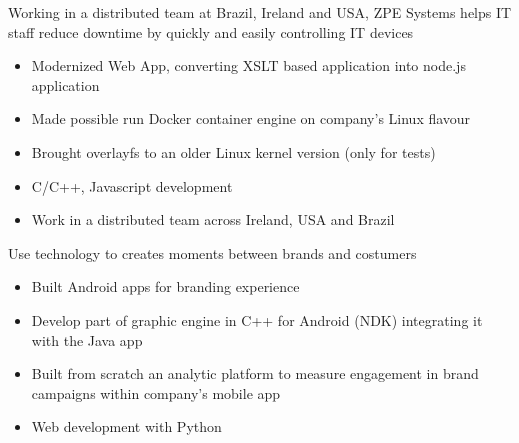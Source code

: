 \documentclass[10pt,a4paper]{altacv}
\begin{document}

\begin{fullwidth}
\makecvheader
\end{fullwidth}


Working in a distributed team at Brazil, Ireland and USA, ZPE Systems helps IT staff reduce downtime by quickly and easily controlling IT devices
\begin{itemize}
\item Modernized Web App, converting XSLT based application into node.js application 
\item Made possible run Docker container engine on company's Linux flavour
\item Brought overlayfs to an older Linux kernel version (only for tests)
\item C/C++, Javascript development
\item Work in a distributed team across Ireland, USA and Brazil
\end{itemize}

\divider

Use technology to creates moments between brands and costumers
\begin{itemize}
\item Built Android apps for branding experience
\item Develop part of graphic engine in C++ for Android (NDK) integrating it with the Java app
\item Built from scratch an analytic platform to measure engagement in brand campaigns within company's mobile app
\item Web development with Python
\end{itemize}
\end{document}
